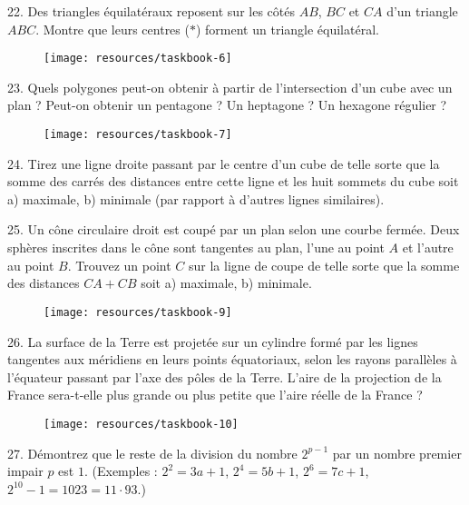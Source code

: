 \begin{problem}{22.}
	Des triangles équilatéraux reposent sur les côtés $AB$, $BC$ et $CA$
	d'un triangle $ABC$.
	Montre que leurs centres ($*$) forment un triangle équilatéral.
	\begin{figure}
		\texttt{[image: resources/taskbook-6]}
	\end{figure}
\end{problem}

\begin{problem}{23.}
	Quels polygones peut-on obtenir à partir de l'intersection d'un cube
	avec un plan ?
	Peut-on obtenir un pentagone ? Un heptagone ? Un hexagone régulier ?
	\begin{figure}
		\texttt{[image: resources/taskbook-7]}
	\end{figure}
\end{problem}

\begin{problem}{24.}
	Tirez une ligne droite passant par le centre d'un cube de telle sorte que la
	somme des carrés des distances entre cette ligne et les huit sommets du cube
	soit a) maximale, b) minimale (par rapport à d'autres lignes similaires).
\end{problem}

\begin{problem}{25.}
	Un cône circulaire droit est coupé par un plan selon une courbe fermée. Deux
	sphères inscrites dans le cône sont tangentes au plan, l'une au point $A$ et
	l'autre au point $B$. Trouvez un point $C$ sur la ligne de coupe de telle
	sorte que la somme des distances $CA + CB$ soit a) maximale, b) minimale.
	\begin{figure}
		\texttt{[image: resources/taskbook-9]}
	\end{figure}
\end{problem}

\begin{problem}{26.}
	La surface de la Terre est projetée sur un cylindre formé par les lignes
	tangentes aux méridiens en leurs points équatoriaux, selon les rayons
	parallèles à l'équateur passant par l'axe des pôles de la Terre.
	L'aire de la projection de la France sera-t-elle plus grande ou plus petite
	que l'aire réelle de la France ?
	\begin{figure}
		\texttt{[image: resources/taskbook-10]}
	\end{figure}
\end{problem}

\begin{problem}{27.}
	Démontrez que le reste de la division du nombre $2^{p-1}$ par un nombre
	premier impair $p$ est $1$.
	(Exemples : $2^2 = 3a + 1$, $2^4 = 5b+1$, $2^6 = 7c+1$, $2^{10} - 1 = 1023 =
	11\cdot 93$.)
\end{problem}

